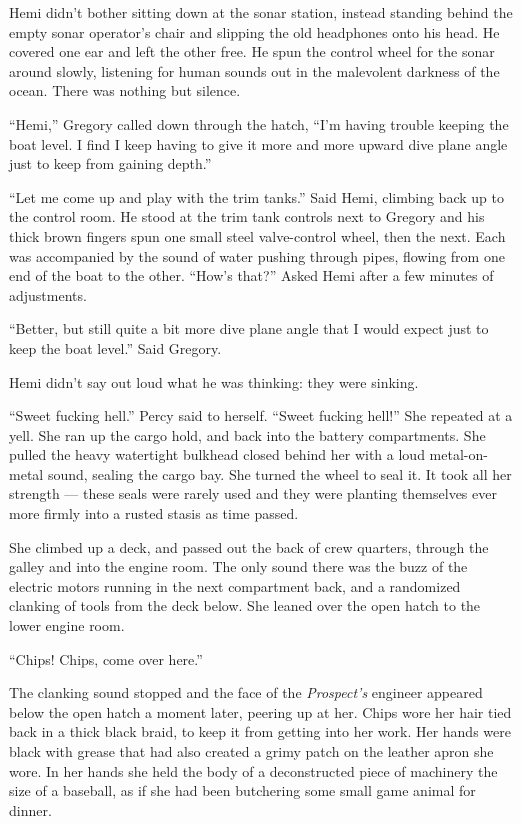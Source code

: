 \documentclass[
]{scrbook}
\begin{document}
Hemi didn't bother sitting down at the sonar station, instead standing
behind the empty sonar operator's chair and slipping the old headphones
onto his head. He covered one ear and left the other free. He spun the
control wheel for the sonar around slowly, listening for human sounds
out in the malevolent darkness of the ocean. There was nothing but
silence.

``Hemi,'' Gregory called down through the hatch, ``I'm having trouble
keeping the boat level. I find I keep having to give it more and more
upward dive plane angle just to keep from gaining depth.''

``Let me come up and play with the trim tanks.'' Said Hemi, climbing
back up to the control room. He stood at the trim tank controls next to
Gregory and his thick brown fingers spun one small steel valve-control
wheel, then the next. Each was accompanied by the sound of water pushing
through pipes, flowing from one end of the boat to the other. ``How's
that?'' Asked Hemi after a few minutes of adjustments.

``Better, but still quite a bit more dive plane angle that I would
expect just to keep the boat level.'' Said Gregory.

Hemi didn't say out loud what he was thinking: they were sinking.

``Sweet fucking hell.'' Percy said to herself. ``Sweet fucking hell!''
She repeated at a yell. She ran up the cargo hold, and back into the
battery compartments. She pulled the heavy watertight bulkhead closed
behind her with a loud metal-on-metal sound, sealing the cargo bay. She
turned the wheel to seal it. It took all her strength --- these seals
were rarely used and they were planting themselves ever more firmly into
a rusted stasis as time passed.

She climbed up a deck, and passed out the back of crew quarters, through
the galley and into the engine room. The only sound there was the buzz
of the electric motors running in the next compartment back, and a
randomized clanking of tools from the deck below. She leaned over the
open hatch to the lower engine room.

``Chips! Chips, come over here.''

The clanking sound stopped and the face of the \emph{Prospect's}
engineer appeared below the open hatch a moment later, peering up at
her. Chips wore her hair tied back in a thick black braid, to keep it
from getting into her work. Her hands were black with grease that had
also created a grimy patch on the leather apron she wore. In her hands
she held the body of a deconstructed piece of machinery the size of a
baseball, as if she had been butchering some small game animal for
dinner.
\end{document}
